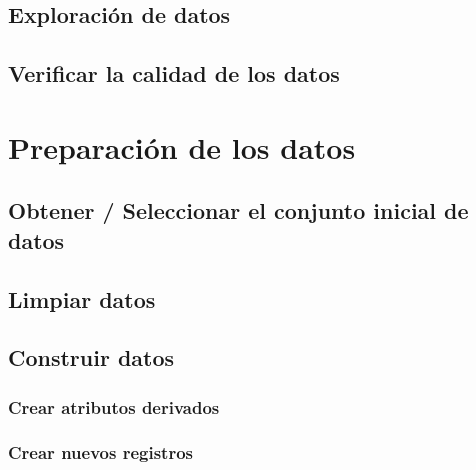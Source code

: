 \documentclass[11pt,a4paper,twoside]{tesis}
\begin{document}
\section{Exploración de datos}\label{exploracion_datos}

\section{Verificar la calidad de los datos}\label{calidad_datos}


\chapter{Preparación de los datos}

\section{Obtener / Seleccionar el conjunto inicial de datos}

\section{Limpiar datos}\label{limpiar_datos}

\section{Construir datos}
\subsection{Crear atributos derivados}\label{atributos_derivados}

\subsection{Crear nuevos registros} %

\end{document}
